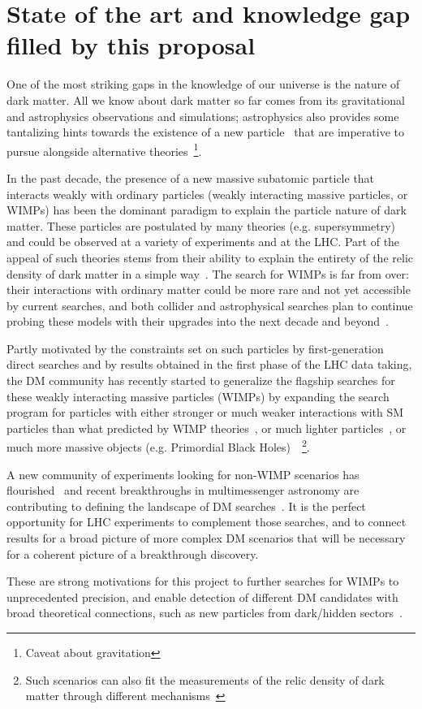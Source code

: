 \section{State of the art and knowledge gap filled by this proposal}

One of the most striking gaps in the knowledge of our universe is the nature of dark matter. All we know about dark matter so far comes from its gravitational and astrophysics observations and simulations; astrophysics also provides some tantalizing hints towards the existence of a new particle~\cite{HooperLeane} that are imperative to pursue alongside alternative theories~\footnote{Caveat about gravitation}. 

In the past decade, the presence of a new massive subatomic particle that interacts weakly with ordinary particles (weakly interacting massive particles, or WIMPs) has been the dominant paradigm to explain the particle nature of dark matter. These particles are postulated by many theories (e.g. supersymmetry) and could be observed at a variety of experiments and at the LHC. Part of the appeal of such theories stems from their ability to explain the entirety of the relic density of dark matter in a simple way~\cite{WIMPMiracle}. The search for WIMPs is far from over: their interactions with ordinary matter could be more rare and not yet accessible by current searches, and both collider and astrophysical searches plan to continue probing these models with their upgrades into the next decade and beyond~\cite{Astro2020, EuropeanStrategy}. 

Partly motivated by the constraints set on such particles by first-generation direct searches and by results obtained in the first phase of the LHC data taking, the DM community has recently started to generalize the flagship searches for these weakly interacting massive particles (WIMPs) by expanding the search program for particles with either stronger or much weaker interactions with SM particles than what predicted by WIMP theories~\cite{FIMPs, StronglyInteracting}, or much lighter particles~\cite{DarkPhotons, ALPs}, or much more massive objects (e.g. Primordial Black Holes)~\cite{GW paper}~\footnote{Such scenarios can also fit the measurements of the relic density of dark matter through different mechanisms~\cite{FreezeIn}}. 

A new community of experiments looking for non-WIMP scenarios has flourished~\cite{PBC} and recent breakthroughs in multimessenger astronomy are contributing to defining the landscape of DM searches~\cite{GWBertone}. 
It is the perfect opportunity for LHC experiments to complement those searches, and to connect results for a broad picture of more complex DM scenarios that will be necessary for a coherent picture of a breakthrough discovery. 

These are strong motivations for this project to further searches for WIMPs to unprecedented precision, and enable detection of different DM candidates with broad theoretical connections, such as new particles from dark/hidden sectors~\cite{HiddenSector}. 